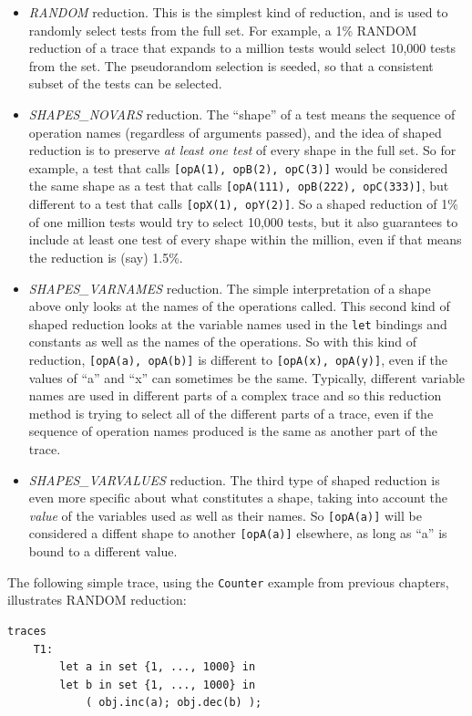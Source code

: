 \documentclass{overturerepchap}
\begin{document}
\begin{itemize}
\item \emph{RANDOM} reduction. This is the simplest kind of reduction, and is
used to randomly select tests from the full set. For example, a 1\% RANDOM 
reduction of a trace that expands to a million tests would select 10,000 tests
from the set. The pseudorandom selection is seeded, so that a consistent subset
of the tests can be selected.
\item \emph{SHAPES\_NOVARS} reduction. The ``shape'' of a test means the sequence
of operation names (regardless of arguments passed), and the idea of shaped
reduction is to preserve \emph{at least one test} of every shape in the full
set. So for example, a test that calls \texttt{[opA(1), opB(2), opC(3)]} would
be considered the same shape as a test that calls \texttt{[opA(111), opB(222),
opC(333)]}, but different to a test that calls \texttt{[opX(1), opY(2)]}. So a
shaped reduction of 1\% of one million tests would try to select 10,000 tests,
but it also guarantees to include at least one test of every shape within the
million, even if that means the reduction is (say) 1.5\%.
\item \emph{SHAPES\_VARNAMES} reduction. The simple interpretation of a
shape above only looks at the names of the operations called. This second kind
of shaped reduction looks at the variable names used in the \texttt{let}
bindings and constants as well as the names of the operations. So with this kind
of reduction, \texttt{[opA(a), opA(b)]} is different to \texttt{[opA(x),
opA(y)]}, even if the values of ``a'' and ``x'' can sometimes be the same.
Typically, different variable names are used in different parts of a complex
trace and so this reduction method is trying to select all of the different
parts of a trace, even if the sequence of operation names produced is the same
as another part of the trace.
\item \emph{SHAPES\_VARVALUES} reduction. The third type of shaped reduction is
even more specific about what constitutes a shape, taking into account the
\emph{value} of the variables used as well as their names. So \texttt{[opA(a)]}
will be considered a diffent shape to another \texttt{[opA(a)]} elsewhere, as
long as ``a'' is bound to a different value.
\end{itemize}

The following simple trace, using the \texttt{Counter} example from previous
chapters, illustrates RANDOM reduction:

\small
\begin{lstlisting}
traces
    T1:
        let a in set {1, ..., 1000} in
        let b in set {1, ..., 1000} in
            ( obj.inc(a); obj.dec(b) );
\end{lstlisting}
\end{document}
